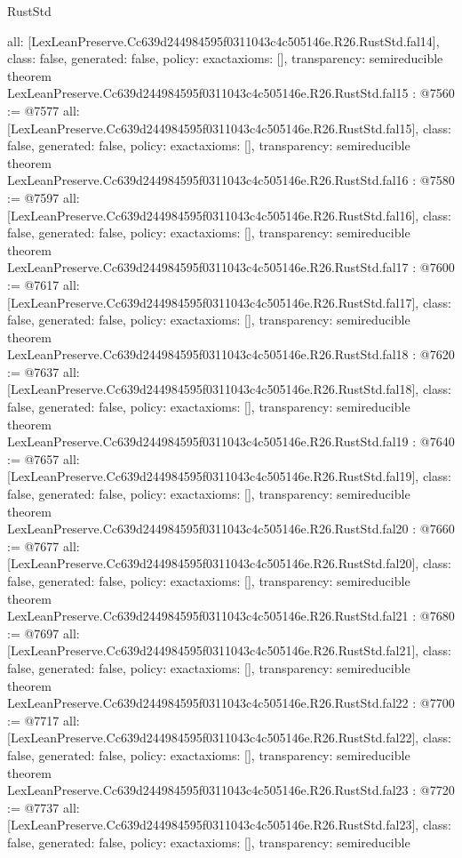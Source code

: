 \begin{lexlean}{RustStd}
\begin{coremodule}
{  all: [LexLeanPreserve.Cc639d244984595f0311043c4c505146e.R26.RustStd.fal14],
  class: false,
  generated: false,
  policy: exact{axioms: []},
  transparency: semireducible
}
theorem LexLeanPreserve.Cc639d244984595f0311043c4c505146e.R26.RustStd.fal15 : @7560 := @7577 {
  all: [LexLeanPreserve.Cc639d244984595f0311043c4c505146e.R26.RustStd.fal15],
  class: false,
  generated: false,
  policy: exact{axioms: []},
  transparency: semireducible
}
theorem LexLeanPreserve.Cc639d244984595f0311043c4c505146e.R26.RustStd.fal16 : @7580 := @7597 {
  all: [LexLeanPreserve.Cc639d244984595f0311043c4c505146e.R26.RustStd.fal16],
  class: false,
  generated: false,
  policy: exact{axioms: []},
  transparency: semireducible
}
theorem LexLeanPreserve.Cc639d244984595f0311043c4c505146e.R26.RustStd.fal17 : @7600 := @7617 {
  all: [LexLeanPreserve.Cc639d244984595f0311043c4c505146e.R26.RustStd.fal17],
  class: false,
  generated: false,
  policy: exact{axioms: []},
  transparency: semireducible
}
theorem LexLeanPreserve.Cc639d244984595f0311043c4c505146e.R26.RustStd.fal18 : @7620 := @7637 {
  all: [LexLeanPreserve.Cc639d244984595f0311043c4c505146e.R26.RustStd.fal18],
  class: false,
  generated: false,
  policy: exact{axioms: []},
  transparency: semireducible
}
theorem LexLeanPreserve.Cc639d244984595f0311043c4c505146e.R26.RustStd.fal19 : @7640 := @7657 {
  all: [LexLeanPreserve.Cc639d244984595f0311043c4c505146e.R26.RustStd.fal19],
  class: false,
  generated: false,
  policy: exact{axioms: []},
  transparency: semireducible
}
theorem LexLeanPreserve.Cc639d244984595f0311043c4c505146e.R26.RustStd.fal20 : @7660 := @7677 {
  all: [LexLeanPreserve.Cc639d244984595f0311043c4c505146e.R26.RustStd.fal20],
  class: false,
  generated: false,
  policy: exact{axioms: []},
  transparency: semireducible
}
theorem LexLeanPreserve.Cc639d244984595f0311043c4c505146e.R26.RustStd.fal21 : @7680 := @7697 {
  all: [LexLeanPreserve.Cc639d244984595f0311043c4c505146e.R26.RustStd.fal21],
  class: false,
  generated: false,
  policy: exact{axioms: []},
  transparency: semireducible
}
theorem LexLeanPreserve.Cc639d244984595f0311043c4c505146e.R26.RustStd.fal22 : @7700 := @7717 {
  all: [LexLeanPreserve.Cc639d244984595f0311043c4c505146e.R26.RustStd.fal22],
  class: false,
  generated: false,
  policy: exact{axioms: []},
  transparency: semireducible
}
theorem LexLeanPreserve.Cc639d244984595f0311043c4c505146e.R26.RustStd.fal23 : @7720 := @7737 {
  all: [LexLeanPreserve.Cc639d244984595f0311043c4c505146e.R26.RustStd.fal23],
  class: false,
  generated: false,
  policy: exact{axioms: []},
  transparency: semireducible
}
\end{coremodule}
\end{lexlean}
